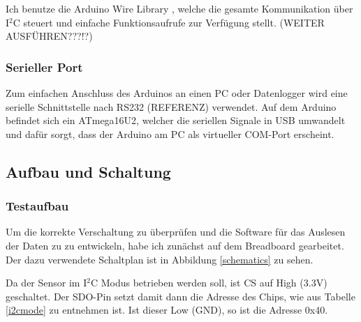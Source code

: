 \documentclass[12pt,a4paper]{scrartcl}
\begin{document}
Ich benutze die Arduino Wire Library \citep{:2012vn}, welche die gesamte Kommunikation über I$^2$C steuert und einfache Funktionsaufrufe zur Verfügung stellt. (WEITER AUSFÜHREN???!?)

\subsubsection{Serieller Port}
Zum einfachen Anschluss des Arduinos an einen PC oder Datenlogger wird eine serielle Schnittstelle nach RS232 (REFERENZ) verwendet. Auf dem Arduino befindet sich ein ATmega16U2, welcher die seriellen Signale in USB umwandelt und dafür sorgt, dass der Arduino am PC als virtueller COM-Port erscheint.

\newpage
\subsection{Aufbau und Schaltung}

\subsubsection{Testaufbau}

Um die korrekte Verschaltung zu überprüfen und die Software für das Auslesen der Daten zu zu entwickeln, habe ich zunächst auf dem Breadboard gearbeitet. Der dazu verwendete Schaltplan ist in Abbildung \ref{schematics} zu sehen.

Da der Sensor im I$^2$C Modus betrieben werden soll, ist CS auf High (3.3V) geschaltet. Der SDO-Pin setzt damit dann die Adresse des Chips, wie aus Tabelle \ref{i2cmode} zu entnehmen ist. Ist dieser Low (GND), so ist die Adresse 0x40.



\begin{figure}[h]
\centering

\end{figure}
\end{document}
